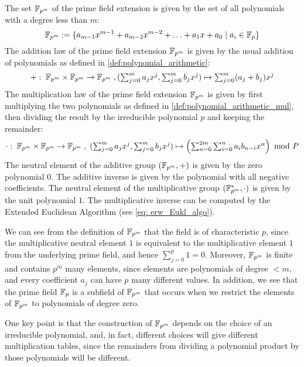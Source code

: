 The set $\mathbb{F}_{p^m}$ of the prime field extension is given by the set of all polynomials with a degree less than $m$:
\begin{equation}
\label{eq:prime-extension-field}
\mathbb{F}_{p^m}:= \{a_{m-1} x^{m-1}+a_{m-2}x^{m-2}+\ldots+a_1 x+a_0\;|\; a_i\in \mathbb{F}_p\}
\end{equation}
The addition law of the prime field extension $\mathbb{F}_{p^m}$ is given by the usual addition of polynomials as defined in \eqref{def:polynomial_arithmetic}: 
\begin{equation}
+:\; \mathbb{F}_{p^m}\times \mathbb{F}_{p^m} \to \mathbb{F}_{p^m}\; , \textstyle (\sum_{j=0}^m a_j x^j,\sum_{j=0}^m b_j x^j)\mapsto \sum_{j=0}^m (a_j+b_j) x^j
\end{equation}
The multiplication law of the prime field extension $\mathbb{F}_{p^m}$ is given by first multiplying the two polynomials as defined in \eqref{def:polynomial_arithmetic_mul},  then dividing the result by the irreducible polynomial $p$ and keeping the remainder:
\begin{equation}
\cdot : \; \mathbb{F}_{p^m}\times \mathbb{F}_{p^m} \to \mathbb{F}_{p^m}\; , \textstyle\; (\sum_{j=0}^m a_j x^j,\sum_{j=0}^m b_j x^j)\mapsto \left(\sum _{n = 0} ^{2m} \sum _{i = 0} ^{n}{a} _{i }{{b} _{n-i}}{x} ^{n}\right) \text{ mod } P
\end{equation}
The neutral element of the additive group $(\mathbb{F}_{p^m},+)$ is given by the zero polynomial $0$. The additive inverse is given by the polynomial with all negative coefficients. The neutral element of the multiplicative group $(\mathbb{F}^*_{p^m},\cdot)$ is given by the unit polynomial $1$. The multiplicative inverse can be computed by the Extended Euclidean Algorithm (see \ref{eq: erw_Eukl_algo}).

We can see from the definition of $\mathbb{F}_{p^m}$ that the field is of characteristic $p$, since the multiplicative neutral element $1$ is equivalent to the multiplicative element $1$ from the underlying prime field, and hence $\sum_{j=0}^p 1=0$. Moreover, $\mathbb{F}_{p^m}$ is finite and contains $p^m$ many elements, since elements are polynomials of degree $<m$, and every coefficient $a_j$ can have $p$ many different values. In addition, we see that the prime field $\mathbb{F}_p$ is a subfield of $\mathbb{F}_{p^m}$ that occurs when we restrict the elements of $\mathbb{F}_{p^m}$ to polynomials of degree zero.

One key point is that the construction of $\mathbb{F}_{p^m}$ depends on the choice of an irreducible polynomial, and, in fact, different choices will give different multiplication tables, since the remainders from dividing a polynomial product by those polynomials will be different.

